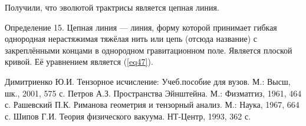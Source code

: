 \documentclass[14pt,a4paper]{extarticle}
\begin{document}
Получили, что эволютой трактрисы является цепная линия.

Определение 15. Цепная линия — линия, форму которой принимает гибкая однородная нерастяжимая тяжёлая нить или цепь (отсюда название) с закреплёнными концами в однородном гравитационном поле. Является плоской кривой. Её уравнением является (\ref{eq47}).






























\clearpage
{}
\begin{thebibliography}{3}
	Димитриенко Ю.И. Тензорное исчисление: Учеб.пособие для вузов. М.: Высш,	шк., 2001, 575 с.
	Петров А.З. Пространства Эйнштейна. М.: Физматгиз, 1961, 464 с.
	Рашевский П.К. Риманова геометрия и тензорный анализ. М.: Наука, 1967, 664 с.
	Шипов Г.И. Теория физического вакуума. НТ-Центр, 1993, 362 с.

\end{thebibliography}
\end{document}
